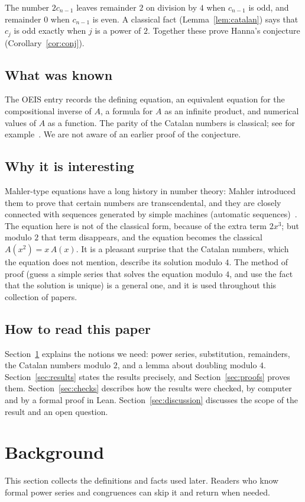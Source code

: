 \documentclass[11pt,a4paper]{article}
\theoremstyle{definition}
\theoremstyle{remark}
\begin{document}
The number $2c_{n-1}$ leaves remainder $2$ on division by $4$ when $c_{n-1}$ is odd, and remainder $0$ when $c_{n-1}$ is
even. A classical fact (Lemma~\ref{lem:catalan}) says that $c_j$ is odd exactly when $j$ is a power of $2$. Together
these prove Hanna's conjecture (Corollary~\ref{cor:conj}).

\subsection{What was known}
The OEIS entry records the defining equation, an equivalent equation for the compositional inverse of $A$, a formula
for $A$ as an infinite product, and numerical values of $A$ as a function. The parity of the Catalan numbers is classical;
see for example~\cite{deutschsagan}. We are not aware of an earlier proof of the conjecture.

\subsection{Why it is interesting}
Mahler-type equations have a long history in number theory: Mahler introduced them to prove that certain numbers are
transcendental, and they are closely connected with sequences generated by simple machines (automatic
sequences)~\cite{allouche}. The equation here is not of the classical form, because of the extra term $2x^3$; but
modulo $2$ that term disappears, and the equation becomes the classical $A(x^2)=x\,A(x)$. It is a pleasant surprise that the Catalan numbers, which the equation does not
mention, describe its solution modulo $4$. The method of proof (guess a simple series that solves the equation modulo
$4$, and use the fact that the solution is unique) is a general one, and it is used throughout this collection of
papers.

\subsection{How to read this paper}
Section~\ref{sec:background} explains the notions we need: power series, substitution, remainders, the Catalan numbers
modulo $2$, and a lemma about doubling modulo $4$. Section~\ref{sec:results} states the results precisely, and
Section~\ref{sec:proofs} proves them. Section~\ref{sec:checks} describes how the results were checked, by computer and
by a formal proof in Lean. Section~\ref{sec:discussion} discusses the scope of the result and an open question.
\section{Background}\label{sec:background}
This section collects the definitions and facts used later. Readers who know formal power series and congruences can skip it and return when needed.
\end{document}
